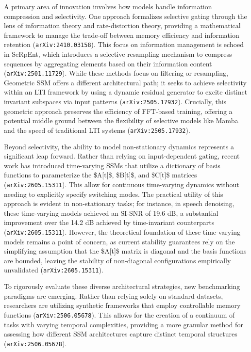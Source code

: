 \documentclass[11pt]{article}
\begin{document}
A primary area of innovation involves how models handle information compression and selectivity. One approach formalizes selective gating through the lens of information theory and rate-distortion theory, providing a mathematical framework to manage the trade-off between memory efficiency and information retention (\texttt{arXiv:2410.03158}). This focus on information management is echoed in SeRpEnt, which introduces a selective resampling mechanism to compress sequences by aggregating elements based on their information content (\texttt{arXiv:2501.11729}). While these methods focus on filtering or resampling, Geometric SSM offers a different architectural path; it seeks to achieve selectivity within an LTI framework by using a dynamic residual generator to excite distinct invariant subspaces via input patterns (\texttt{arXiv:2505.17932}). Crucially, this geometric approach preserves the efficiency of FFT-based training, offering a potential middle ground between the flexibility of selective models like Mamba and the speed of traditional LTI systems (\texttt{arXiv:2505.17932}).

Beyond selectivity, the ability to model non-stationary dynamics represents a significant leap forward. Rather than relying on input-dependent gating, recent work has introduced time-varying SSMs that utilize a dictionary of basis functions to parameterize the \$A[t]\$, \$B[t]\$, and \$C[t]\$ matrices (\texttt{arXiv:2605.15311}). This allow for continuous time-varying dynamics without needing to explicitly specify switching modes. The practical utility of this approach is evident in non-stationary tasks; for instance, in speech denoising, these time-varying models achieved an SI-SNR of 19.6 dB, a substantial improvement over the 14.2 dB achieved by time-invariant counterparts (\texttt{arXiv:2605.15311}). However, the theoretical foundation of these time-varying models remains a point of concern, as current stability guarantees rely on the simplifying assumption that the \$A[t]\$ matrix is diagonal and the basis functions are bounded, leaving the stability of non-diagonal configurations empirically unvalidated (\texttt{arXiv:2605.15311}).

To rigorously evaluate these diverse architectural strategies, new benchmarking paradigms are emerging. Rather than relying solely on standard datasets, researchers are utilizing synthetic frameworks that employ controllable memory functions (\texttt{arXiv:2506.05678}). This allows for the creation of a continuum of tasks with varying temporal complexities, providing a more granular method for assessing how different SSM architectures capture distinct temporal structures (\texttt{arXiv:2506.05678}).
\end{document}
